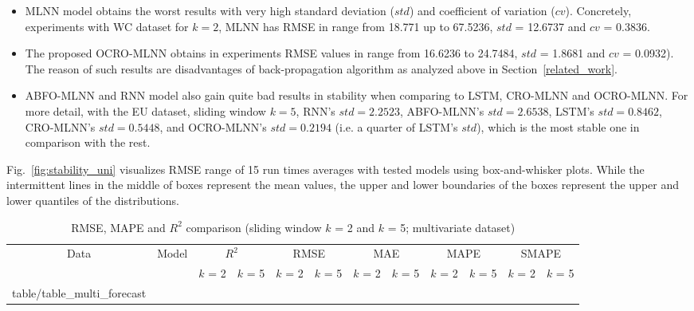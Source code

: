 \documentclass[11pt,twoside]{article}
\makeatletter
\newcommand\primitiveinput[1]
		{\@@input #1 }
\makeatother
\begin{document}
\begin{multicols}{2}
\begin{itemize}
\item MLNN model obtains the worst results with very high standard deviation ($std$) and coefficient of variation ($cv$). Concretely, experiments with WC dataset for $k = 2$, MLNN has RMSE in range from 18.771 up to 67.5236, $std$ = 12.6737 and $cv$ = 0.3836.
\item The proposed OCRO-MLNN obtains in experiments RMSE values in range from 16.6236 to 24.7484, $std$ = 1.8681 and $cv$ = 0.0932). The reason of such results are disadvantages of back-propagation algorithm as analyzed above in Section~\ref{related_work}. 
\item ABFO-MLNN and RNN model also gain quite bad results in stability when comparing to LSTM, CRO-MLNN and OCRO-MLNN. For more detail, with the EU dataset, sliding window $k = 5$, RNN's $std = 2.2523$, ABFO-MLNN's $std = 2.6538$, LSTM's $std = 0.8462$, CRO-MLNN's $std = 0.5448$, and OCRO-MLNN's $std = 0.2194$ (i.e. a quarter of LSTM's $std$), which is the most stable one in comparison with the rest.
\end{itemize}

Fig.~\ref{fig:stability_uni} visualizes RMSE range of 15 run times averages with tested models using box-and-whisker plots. While the intermittent lines in the middle of boxes represent the mean values, the upper and lower boundaries of the boxes represent the upper and lower quantiles of the distributions. 




\begin{table}[!t]
	\caption{RMSE, MAPE and $R^2$ comparison (sliding window $k$ = 2 and $k$ = 5; multivariate dataset)}
	\label{table:multi_forecast}
	\centering
	\begin{adjustbox}{width=0.45\textwidth, angle=270}
	\begin{sideways}
		\begin{tabular}{| c | c | c | c | c | c | c | c | c | c | c | c |}%
			\hline
			\multirow{2}{*}{Data} & \multirow{2}{*}{Model} & \multicolumn{2}{c|}{$R^2$} & \multicolumn{2}{c|}{RMSE} & \multicolumn{2}{c|}{MAE} & \multicolumn{2}{c|}{MAPE}  & \multicolumn{2}{c|}{SMAPE} \\ \cline{3-12}
   				& & $k$ = 2 & $k$ = 5 & $k$ = 2 & $k$ = 5 & $k$ = 2 & $k$ = 5 & $k$ = 2 & $k$ = 5 & $k$ = 2 & $k$ = 5 \\ [0.5ex] 
			\hline
			\primitiveinput{table/table_multi_forecast}
			\hline
		\end{tabular}
	\end{sideways}
	\end{adjustbox}
\end{table}




\end{multicols}
\end{document}
